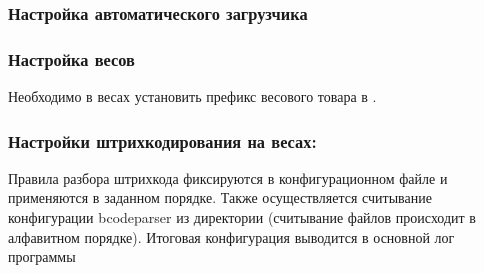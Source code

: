 \documentclass[a4paper,10pt,russian]{report}
\begin{document}
\begin{figure}[htbp]
\centering

\noindent{}
\end{figure}
\subsubsection*{Настройка автоматического загрузчика}

\sphinxAtStartPar
{}

\begin{figure}[htbp]
\centering

\noindent{}
\end{figure}

\sphinxAtStartPar
{}

\begin{figure}[htbp]
\centering

\noindent{}
\end{figure}

\sphinxAtStartPar
{}

\begin{figure}[htbp]
\centering

\noindent{}
\end{figure}
\subsubsection*{Настройка весов}

\sphinxAtStartPar
Необходимо в весах установить префикс весового товара в .
\subsubsection*{Настройки штрихкодирования на весах:}

\sphinxAtStartPar
Правила разбора штрих\sphinxhyphen{}кода фиксируются в конфигурационном файле 
и применяются в заданном порядке. Также осуществляется считывание конфигурации bcodeparser из директории
 (считывание файлов происходит в алфавитном порядке).
Итоговая конфигурация выводится в основной лог программы 
\end{document}
